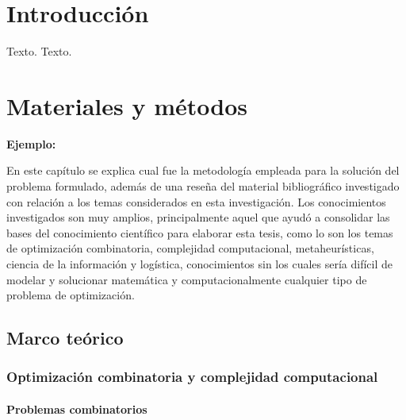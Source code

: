 \chapter{Introducción}
\setcounter{page}{1}
 



Texto.
\vskip 0.3cm
Texto.











\chapter{Materiales y métodos}

{\bf Ejemplo:}\par

En este capítulo se explica cual fue la metodología empleada para la solución del problema formulado, además de una reseña del material bibliográfico investigado con relación a los temas considerados en esta investigación. Los conocimientos investigados son muy amplios, principalmente aquel que ayudó a consolidar las bases del conocimiento científico para elaborar esta tesis, como lo son los temas de optimización combinatoria, complejidad computacional, metaheurísticas, ciencia de la información y logística, conocimientos sin los cuales sería difícil de modelar y solucionar matemática y computacionalmente cualquier tipo de problema de optimización.


\section{Marco teórico}
\subsection{Optimización combinatoria y complejidad computacional}
\subsubsection{Problemas combinatorios}
